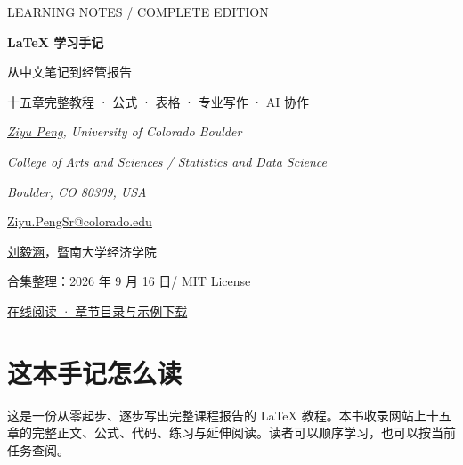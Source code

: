 \documentclass[UTF8,a4paper,11pt,fontset=fandol,oneside,openany]{ctexbook}
\begin{document}
\begin{titlepage}
\pagecolor{PaperCream}
\vspace*{18mm}
{\sffamily\small\color{InkPurple}LEARNING NOTES \quad / \quad COMPLETE EDITION\par}
\vspace{16mm}
{\fontsize{35}{47}\selectfont\bfseries\color{InkPurple}LaTeX 学习手记\par}
\vspace{7mm}
{\LARGE 从中文笔记到经管报告\par}
\vspace{8mm}
{\large 十五章完整教程 · 公式 · 表格 · 专业写作 · AI 协作\par}
\vspace{24mm}
{\large\textit{\href{https://github.com/pzy54154631-hub}{Ziyu Peng}, University of Colorado Boulder}\par}
\vspace{1mm}
{\normalsize\textit{College of Arts and Sciences \enspace / \enspace Statistics and Data Science}\par}
{\normalsize\textit{Boulder, CO 80309, USA}\par}
{\normalsize\href{mailto:Ziyu.PengSr@colorado.edu}{Ziyu.PengSr@colorado.edu}\par}
\vspace{3mm}
{\large\href{https://pzy54154631-hub.github.io/liuyihan/}{刘毅涵}，暨南大学经济学院\par}
\vfill
{\small\color{Muted}合集整理：2026 年 9 月 16 日\quad / \quad MIT License\par}
\vspace{4mm}
{\small\href{https://pzy54154631-hub.github.io/liuyihan/blog/latex/}{在线阅读 · 章节目录与示例下载}\par}
\vspace*{11mm}
\end{titlepage}
\nopagecolor
\frontmatter
\chapter*{这本手记怎么读}
这是一份从零起步、逐步写出完整课程报告的 LaTeX 教程。本书收录网站上十五章的完整正文、公式、代码、练习与延伸阅读。读者可以顺序学习，也可以按当前任务查阅。
\end{document}
